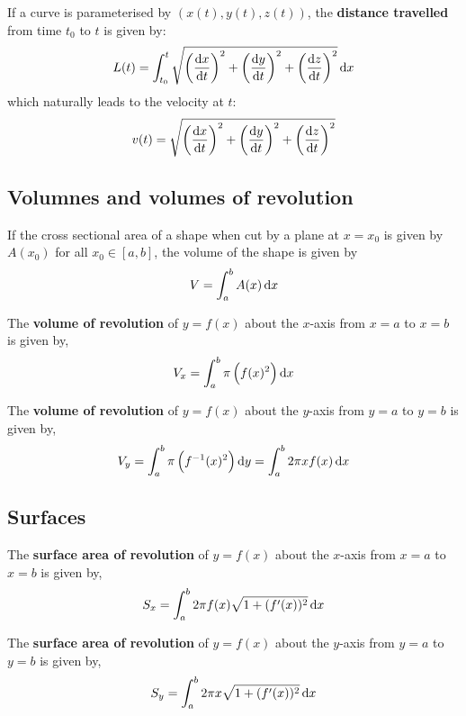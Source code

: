 \documentclass[../Year1/Year1.tex]{subfiles}
\begin{document}
\begin{theorem}
    If a curve is parameterised by $(x(t),y(t),z(t))$, the \textbf{distance travelled} from time $t_0$ to $t$ is given by: \[
        L(t) = \intd{t_0}{t}{\sqrt{\br{\frac{\dif x}{\dif t}}^2+\br{\frac{\dif y}{\dif t}}^2+\br{\frac{\dif z}{\dif t}}^2}}{x}
    \] which naturally leads to the velocity at $t$: \[
        v(t) = \sqrt{\br{\frac{\dif x}{\dif t}}^2+\br{\frac{\dif y}{\dif t}}^2+\br{\frac{\dif z}{\dif t}}^2}
    \]
\end{theorem}

\subsection{Volumnes and volumes of revolution}

\begin{theorem}[Volume]
    If the cross sectional area of a shape when cut by a plane at $x=x_0$ is given by $A(x_0)$ for all $x_0\in[a,b]$, the volume of the shape is given by \[
        V = \intd{a}{b}{A(x)}{x}
    \]
\end{theorem}

\begin{theorem}
    The \textbf{volume of revolution} of $y=f(x)$ about the $x$-axis from $x=a$ to $x=b$ is given by, \[
        V_x = \intd{a}{b}{\pi\br{f(x)^2}}{x}
    \]
\end{theorem}

\begin{theorem}
    The \textbf{volume of revolution} of $y=f(x)$ about the $y$-axis from $y=a$ to $y=b$ is given by, \[
        V_y = \intd{a}{b}{\pi\br{f^{-1}(x)^2}}{y} = \intd{a}{b}{2\pi xf(x)}{x}
    \]
\end{theorem}

\subsection{Surfaces}

\begin{theorem}
    The \textbf{surface area of revolution} of $y=f(x)$ about the $x$-axis from $x=a$ to $x=b$ is given by, \[
        S_x = \intd{a}{b}{2\pi f(x)\sqrt{1+(f'(x))^2}}{x}
    \]
\end{theorem}

\begin{theorem}
    The \textbf{surface area of revolution} of $y=f(x)$ about the $y$-axis from $y=a$ to $y=b$ is given by, \[
        S_y = \intd{a}{b}{2\pi x\sqrt{1+(f'(x))^2}}{x}
    \]
\end{theorem}
\end{document}

